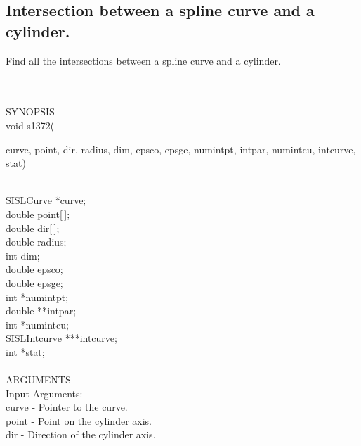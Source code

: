 \subsection{Intersection between a spline curve and a cylinder.}
\begin{minipg1}
  Find all the intersections between a spline curve and a cylinder.

\end{minipg1} \\ \\
SYNOPSIS\\
        \>void s1372(\begin{minipg3}
        {\fov curve}, {\fov point}, {\fov dir}, {\fov radius}, {\fov dim}, {\fov epsco}, {\fov epsge}, {\fov numintpt}, {\fov intpar},
                        {\fov numintcu}, {\fov intcurve}, {\fov stat})
                \end{minipg3}\\[0.3ex]
                \>\>    SISLCurve       \>      *{\fov curve};\\
                \>\>    double  \>      {\fov point}[\,];\\
                \>\>    double  \>      {\fov dir}[\,];\\
                \>\>    double  \>      {\fov radius};\\
                \>\>    int     \>      {\fov dim};\\
                \>\>    double  \>      {\fov epsco};\\
                \>\>    double  \>      {\fov epsge};\\
                \>\>    int     \>      *{\fov numintpt};\\
                \>\>    double  \>      **{\fov intpar};\\
                \>\>    int     \>      *{\fov numintcu};\\
                \>\>    SISLIntcurve \> ***{\fov intcurve};\\
                \>\>    int     \>      *{\fov stat};\\
\\
ARGUMENTS\\
        \>Input Arguments:\\
        \>\>    {\fov curve}    \> - \> Pointer to the curve.\\
        \>\>    {\fov point}    \> - \> Point on the cylinder axis.\\
        \>\>    {\fov dir}      \> - \> Direction of the cylinder axis.\\

